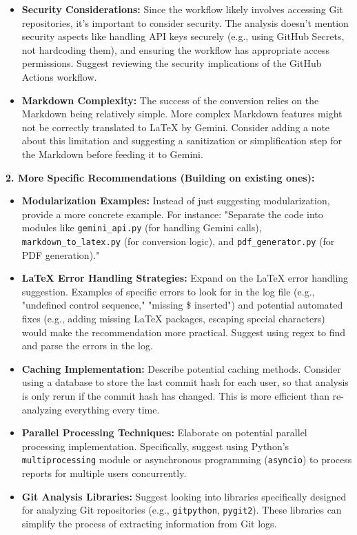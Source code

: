 \documentclass{article}
\begin{document}
\begin{itemize}
\begin{itemize}
\begin{itemize}
            \item \textbf{Security Considerations:} Since the workflow likely involves accessing Git repositories, it's important to consider security. The analysis doesn't mention security aspects like handling API keys securely (e.g., using GitHub Secrets, not hardcoding them), and ensuring the workflow has appropriate access permissions. Suggest reviewing the security implications of the GitHub Actions workflow.
            \item \textbf{Markdown Complexity:}  The success of the conversion relies on the Markdown being relatively simple. More complex Markdown features might not be correctly translated to LaTeX by Gemini.  Consider adding a note about this limitation and suggesting a sanitization or simplification step for the Markdown before feeding it to Gemini.
        \end{itemize}
        \textbf{2. More Specific Recommendations (Building on existing ones):}
        \begin{itemize}
            \item \textbf{Modularization Examples:}  Instead of just suggesting modularization, provide a more concrete example. For instance: "Separate the code into modules like \texttt{gemini\_api.py} (for handling Gemini calls), \texttt{markdown\_to\_latex.py} (for conversion logic), and \texttt{pdf\_generator.py} (for PDF generation)."
           \item \textbf{LaTeX Error Handling Strategies:}  Expand on the LaTeX error handling suggestion.  Examples of specific errors to look for in the log file (e.g., "undefined control sequence," "missing \$ inserted") and potential automated fixes (e.g., adding missing LaTeX packages, escaping special characters) would make the recommendation more practical.  Suggest using regex to find and parse the errors in the log.
           \item \textbf{Caching Implementation:} Describe potential caching methods. Consider using a database to store the last commit hash for each user, so that analysis is only rerun if the commit hash has changed. This is more efficient than re-analyzing everything every time.
           \item \textbf{Parallel Processing Techniques:} Elaborate on potential parallel processing implementation. Specifically, suggest using Python's \texttt{multiprocessing} module or asynchronous programming (\texttt{asyncio}) to process reports for multiple users concurrently.
           \item \textbf{Git Analysis Libraries:} Suggest looking into libraries specifically designed for analyzing Git repositories (e.g., \texttt{gitpython}, \texttt{pygit2}). These libraries can simplify the process of extracting information from Git logs.

\end{itemize}
\end{itemize}
\end{itemize}
\end{document}
